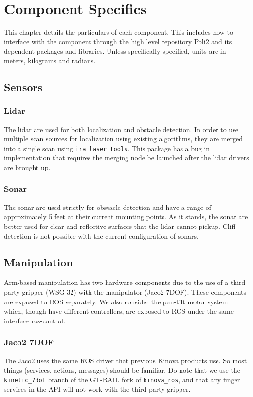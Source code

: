 \chapter{Component Specifics}\label{ch:componentspecifics}
This chapter details the particulars of each component. This includes how to interface with the component through the high level repository \href{https://github.com/si-machines/poli2}{Poli2} and its dependent packages and libraries. Unless specifically specified, units are in meters, kilograms and radians.

\section{Sensors}
\subsection{Lidar}
The lidar are used for both localization and obstacle detection. 
In order to use multiple scan sources for localization using existing algorithms, they are merged into a single scan using \texttt{ira\_laser\_tools}. 
This package has a bug in implementation that requires the merging node be launched after the lidar drivers are brought up. \\

\subsection{Sonar}
The sonar are used strictly for obstacle detection and have a range of approximately 5 feet at their current mounting points. 
As it stands, the sonar are better used for clear and reflective surfaces that the lidar cannot pickup. 
Cliff detection is not possible with the current configuration of sonars.

\section{Manipulation}
Arm-based manipulation has two hardware components due to the use of a third party gripper (WSG-32) with the manipulator (Jaco2 7DOF). These components are exposed to ROS separately. We also consider the pan-tilt motor system which, though have different controllers, are exposed to ROS under the same interface ros-control. 

\subsection{Jaco2 7DOF}
The Jaco2 uses the same ROS driver that previous Kinova products use. So most things (services, actions, messages) should be familiar. 
Do note that we use the \texttt{kinetic\_7dof} branch of the GT-RAIL fork of \texttt{kinova\_ros}, and that any finger services in the API will not work with the third party gripper.


